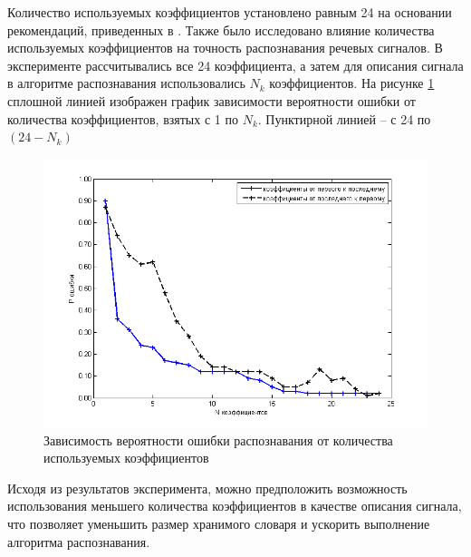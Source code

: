 \documentclass[a4paper,14pt,russian,utf8,nocolumnsxix,nocolumnxxxi,nocolumnxxxii]{eskdtext}
\begin{document}
Количество используемых коэффициентов установлено равным 24 на основании рекомендаций, приведенных в \cite{spokenlang}. Также было исследовано влияние количества используемых коэффициентов на точность распознавания речевых сигналов. В эксперименте рассчитывались все 24 коэффициента, а затем для описания сигнала в алгоритме распознавания использовались $N_k$ коэффициентов. На рисунке \ref{mfcc_number} сплошной линией изображен график зависимости вероятности ошибки от количества коэффициентов, взятых с 1 по $N_k$. Пунктирной линией -- с 24 по $(24-N_k)$

\begin{figure}[h]
	\centering
	\includegraphics[width=150mm]{decrease_legend.png}
	\caption{Зависимость вероятности ошибки распознавания от количества используемых коэффициентов}
	\label{mfcc_number}
\end{figure}

Исходя из результатов эксперимента, можно предположить возможность использования меньшего количества коэффициентов в качестве описания сигнала, что позволяет уменьшить размер хранимого словаря и ускорить выполнение алгоритма распознавания.

\pagebreak
\end{document}
